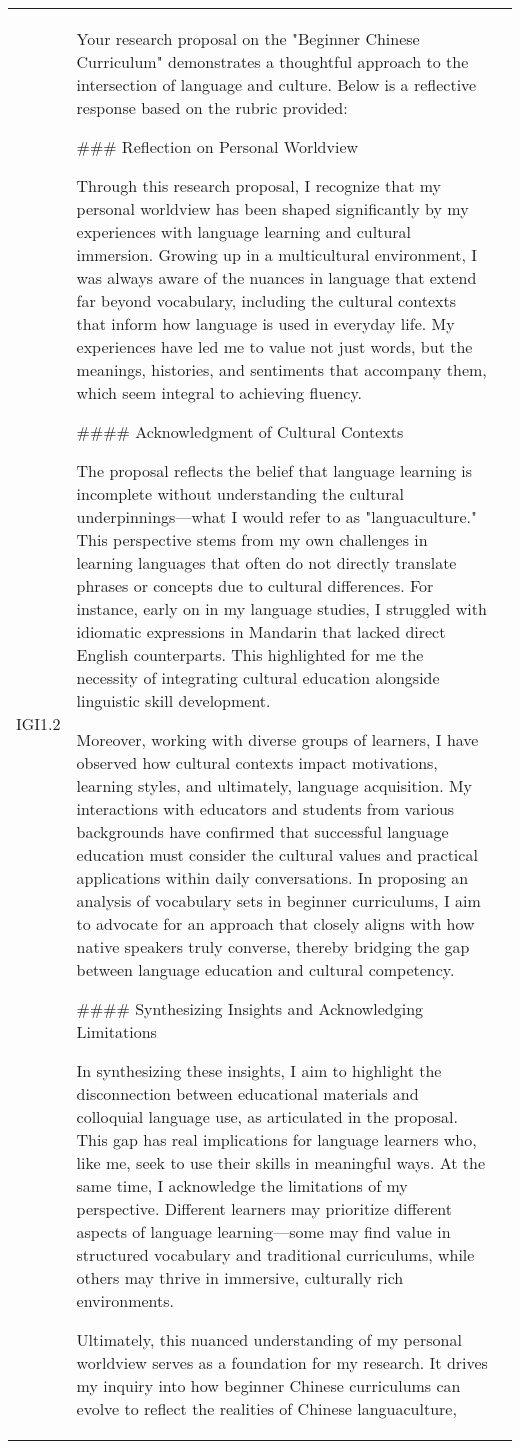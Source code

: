 \begin{center}
\begin{longtable}{|p{}|p{}|p{}|}
IGI1.2 & Your research proposal on the "Beginner Chinese Curriculum" demonstrates a thoughtful approach to the intersection of language and culture. Below is a reflective response based on the rubric provided:\par \#\#\# Reflection on Personal Worldview\par Through this research proposal, I recognize that my personal worldview has been shaped significantly by my experiences with language learning and cultural immersion. Growing up in a multicultural environment, I was always aware of the nuances in language that extend far beyond vocabulary, including the cultural contexts that inform how language is used in everyday life. My experiences have led me to value not just words, but the meanings, histories, and sentiments that accompany them, which seem integral to achieving fluency. \par \#\#\#\# Acknowledgment of Cultural Contexts\par The proposal reflects the belief that language learning is incomplete without understanding the cultural underpinnings—what I would refer to as "languaculture." This perspective stems from my own challenges in learning languages that often do not directly translate phrases or concepts due to cultural differences. For instance, early on in my language studies, I struggled with idiomatic expressions in Mandarin that lacked direct English counterparts. This highlighted for me the necessity of integrating cultural education alongside linguistic skill development.\par Moreover, working with diverse groups of learners, I have observed how cultural contexts impact motivations, learning styles, and ultimately, language acquisition. My interactions with educators and students from various backgrounds have confirmed that successful language education must consider the cultural values and practical applications within daily conversations. In proposing an analysis of vocabulary sets in beginner curriculums, I aim to advocate for an approach that closely aligns with how native speakers truly converse, thereby bridging the gap between language education and cultural competency.\par \#\#\#\# Synthesizing Insights and Acknowledging Limitations\par In synthesizing these insights, I aim to highlight the disconnection between educational materials and colloquial language use, as articulated in the proposal. This gap has real implications for language learners who, like me, seek to use their skills in meaningful ways. At the same time, I acknowledge the limitations of my perspective. Different learners may prioritize different aspects of language learning—some may find value in structured vocabulary and traditional curriculums, while others may thrive in immersive, culturally rich environments. \par Ultimately, this nuanced understanding of my personal worldview serves as a foundation for my research. It drives my inquiry into how beginner Chinese curriculums can evolve to reflect the realities of Chinese languaculture, 
\end{longtable}
\end{center}
